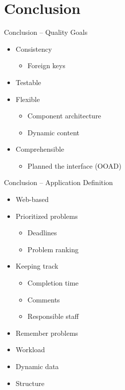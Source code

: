 \section*{Conclusion}
\begin{frame}{Conclusion -- Quality Goals}

\begin{itemize}
	\item Consistency
	\begin{itemize}
		\item Foreign keys
	\end{itemize}
	\item<2-> Testable 
	\item<3-> Flexible
	\begin{itemize}
		\item Component architecture
		\item Dynamic content
	\end{itemize}
	\item<4-> Comprehensible
	\begin{itemize}
		\item Planned the interface (OOAD)
	\end{itemize}
\end{itemize}
\end{frame}

\begin{frame}{Conclusion -- Application Definition}

	\begin{itemize}
	\item Web-based 
	\item<2-> Prioritized problems
	\begin{itemize}
		\item<2-> Deadlines
		\item<2-> Problem ranking
	\end{itemize}
	\item<3-> Keeping track
	\begin{itemize}
		\item<3-> Completion time
		\item<3-> Comments
		\item<3-> Responsible staff
	\end{itemize}	
	\item<4-> Remember problems
	\item<5-> Workload
	\item<6-> Dynamic data
	\item<7-> Structure
\end{itemize}
\end{frame}